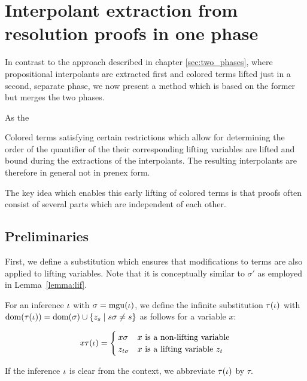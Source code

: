 \chapter{Interpolant extraction from resolution proofs in one phase}
\label{sec:one_phase}

In contrast to the approach described in chapter \ref{sec:two_phases}, where propositional interpolants are extracted first and colored terms lifted just in a second, separate phase, 
we now present a method which is based on the former but merges the two phases.

As the 

Colored terms satisfying certain restrictions which allow for determining the order of the quantifier of the their corresponding lifting variables are lifted and bound during the extractions of the interpolants.
The resulting interpolants are therefore in general not in prenex form.

The key idea which enables this early lifting of colored terms is that proofs often consist of several parts which are independent of each other. 

\section{Preliminaries}

First, we define a substitution which ensures that modifications to terms are also applied to lifting variables. Note that it is conceptually similar to $\sigma'$ as employed in Lemma~\ref{lemma:lif}.

\begin{defi}
	For an inference $\iota$ with $\sigma = \operatorname{mgu}(\iota)$, we define the infinite substitution $\tau(\iota)$ with $\operatorname{dom}(\tau(\iota)) = \operatorname{dom}(\sigma) \cup \{z_s \mid s\sigma \neq s\}$ as follows for a variable $x$:

	\[
		x\tau(\iota) =
		\begin{cases}
			x\sigma & \text{$x$ is a non-lifting variable} \\
			z_{t\sigma} & \text{$x$ is a lifting variable $z_t$}
		\end{cases} 
	\]

	If the inference $\iota$ is clear from the context, we abbreviate $\tau(\iota)$ by $\tau$. 
\end{defi}


